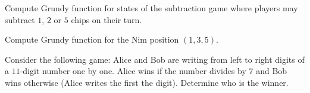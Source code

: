 \documentclass[addpoints,answers]{exam}
\begin{document}
    \pagestyle{headandfoot}
    \runningheadrule

    \firstpagefooter{}{}{}
    \runningfooter{}{}{}
    \begin{flushright}

        \vspace{0.2in}

    \end{flushright}

    \begin{questions}
        \question
            Compute Grundy function for states of the subtraction game where players may
            subtract $1$, $2$ or $5$ chips on their turn.
            \begin{solutionorbox}[\stretch{1}]
            \end{solutionorbox}
            \newpage
        \question
            Compute Grundy function for the Nim position $(1, 3, 5)$.
            \begin{solutionorbox}[\stretch{1}]
            \end{solutionorbox}
            \newpage
        \question
            Consider the following game: Alice and Bob are writing from left to right digits
            of a $11$-digit number one by one. Alice wins if the number divides by $7$ and Bob
            wins otherwise (Alice writes the first the digit). Determine who is the winner.
            \begin{solutionorbox}[\stretch{1}]
            \end{solutionorbox}
            \newpage
\end{questions}
\end{document}
